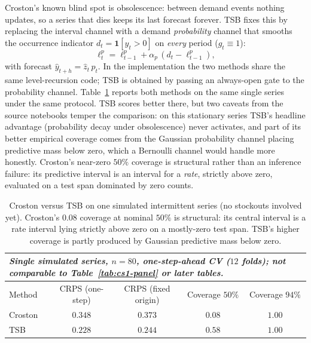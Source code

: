 Croston's known blind spot is obsolescence: between demand events nothing updates, so a series that dies keeps its last forecast forever. TSB \citep{teunter2011intermittent} fixes this by replacing the interval channel with a demand \emph{probability} channel that smooths the occurrence indicator $d_t = \mathbf{1}[y_t > 0]$ on \emph{every} period ($g_t \equiv 1$):
\begin{equation}\label{eq:tsb-prob}
\ell^{p}_t = \ell^{p}_{t-1} + \alpha_p \, (d_t - \ell^{p}_{t-1}),
\end{equation}
with forecast $\hat{y}_{t+h} = \hat{z}_t \, \hat{p}_t$. In the implementation the two methods share the same level-recursion code; TSB is obtained by passing an always-open gate to the probability channel. Table~\ref{tab:cs1-single} reports both methods on the same single series under the same protocol. TSB scores better there, but two caveats from the source notebooks temper the comparison: on this stationary series TSB's headline advantage (probability decay under obsolescence) never activates, and part of its better empirical coverage comes from the Gaussian probability channel placing predictive mass below zero, which a Bernoulli channel would handle more honestly. Croston's near-zero $50\%$ coverage is structural rather than an inference failure: its predictive interval is an interval for a \emph{rate}, strictly above zero, evaluated on a test span dominated by zero counts.

\begin{table}[t]
\centering
\small
\begin{tabular}{lcccc}
\toprule
\multicolumn{5}{l}{\emph{Single simulated series, $n = 80$, one-step-ahead CV ($12$ folds); not comparable to Table~\ref{tab:cs1-panel} or later tables.}} \\
\midrule
Method & CRPS (one-step) & CRPS (fixed origin) & Coverage $50\%$ & Coverage $94\%$ \\
\midrule
Croston & $0.348$ & $0.373$ & $0.08$ & $1.00$ \\
TSB & $0.228$ & $0.244$ & $0.58$ & $1.00$ \\
\bottomrule
\end{tabular}
\caption{Croston versus TSB on one simulated intermittent series (no stockouts involved yet). Croston's $0.08$ coverage at nominal $50\%$ is structural: its central interval is a rate interval lying strictly above zero on a mostly-zero test span. TSB's higher coverage is partly produced by Gaussian predictive mass below zero.}
\label{tab:cs1-single}
\end{table}

